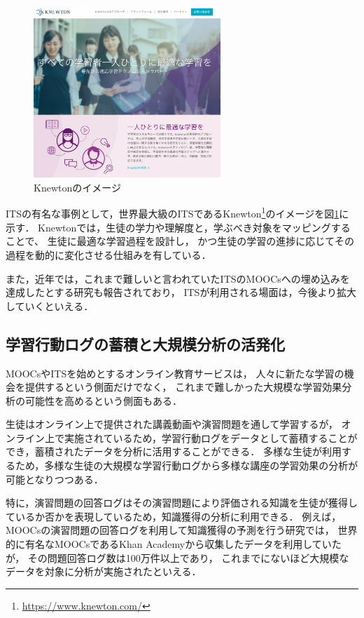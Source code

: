 \begin{figure}[htb]
\begin{center}
\includegraphics[width=200pt]{./img/knewton.png}
\end{center}
\caption{Knewtonのイメージ}
\label{fig:knewton}
\end{figure}

ITSの有名な事例として，世界最大級のITSであるKnewton\footnote{\url{https://www.knewton.com/}}のイメージを図\ref{fig:knewton}に示す．
Knewtonでは，生徒の学力や理解度と，学ぶべき対象をマッピングすることで、
生徒に最適な学習過程を設計し，
かつ生徒の学習の進捗に応じてその過程を動的に変化させる仕組みを有している\cite{upbin2012knewton}．


また，近年では，これまで難しいと言われていたITSのMOOCsへの埋め込みを達成したとする研究\cite{aleven2015beginning}も報告されており，
ITSが利用される場面は，今後より拡大していくといえる．



\subsection{学習行動ログの蓄積と大規模分析の活発化}

MOOCsやITSを始めとするオンライン教育サービスは，
人々に新たな学習の機会を提供するという側面だけでなく，
これまで難しかった大規模な学習効果分析の可能性を高めるという側面もある．

生徒はオンライン上で提供された講義動画や演習問題を通して学習するが，
オンライン上で実施されているため，学習行動ログをデータとして蓄積することができ，蓄積されたデータを分析に活用することができる．
多様な生徒が利用するため，多様な生徒の大規模な学習行動ログから多様な講座の学習効果の分析が可能となりつつある．

特に，演習問題の回答ログはその演習問題により評価される知識を生徒が獲得しているか否かを表現しているため，知識獲得の分析に利用できる．
例えば，MOOCsの演習問題の回答ログを利用して知識獲得の予測を行う研究\cite{machardy2015toward}では，
世界的に有名なMOOCsであるKhan Academyから収集したデータを利用していたが，
その問題回答ログ数は100万件以上であり，
これまでにないほど大規模なデータを対象に分析が実施されたといえる．


